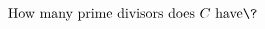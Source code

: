 \documentclass[preview]{standalone}
\begin{document}
\begin{align*}
\text{How many prime divisors does } C \text{ have\?}
\end{align*}
\end{document}
